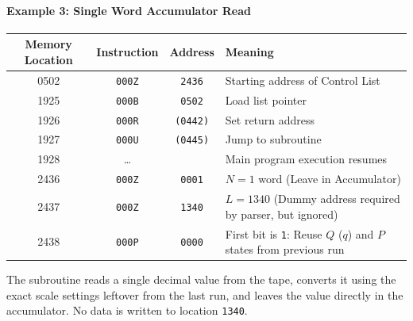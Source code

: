 \paragraph{Example 3: Single Word Accumulator Read}
\begin{table}[h!]
\centering
\begin{tabularx}{\textwidth}{cccX}
\toprule
\textbf{Memory Location} & \textbf{Instruction} & \textbf{Address} & \textbf{Meaning} \\
\midrule
    0502              & \texttt{000Z}   & \texttt{2436}    & Starting address of Control List \\
    1925              & \texttt{000B}   & \texttt{0502}    & Load list pointer \\
    1926              & \texttt{000R}   & \texttt{(0442)}  & Set return address \\
    1927              & \texttt{000U}   & \texttt{(0445)}  & Jump to subroutine \\
    1928              & \dots           &                  & Main program execution resumes \\
    \midrule
    2436              & \texttt{000Z}   & \texttt{0001}    & $N = 1$ word (Leave in Accumulator) \\
    2437              & \texttt{000Z}   & \texttt{1340}    & $L = 1340$ (Dummy address required by parser, but ignored) \\
2438              & \texttt{000P}   & \texttt{0000}    & First bit is \texttt{1}: Reuse $Q$ ($q$) and $P$ states from previous run \\
\bottomrule
\end{tabularx}
\end{table}
The subroutine reads a single decimal value from the tape, converts it using the exact scale settings leftover from the last run, and leaves the value directly in the accumulator. No data is written to location \texttt{1340}.

